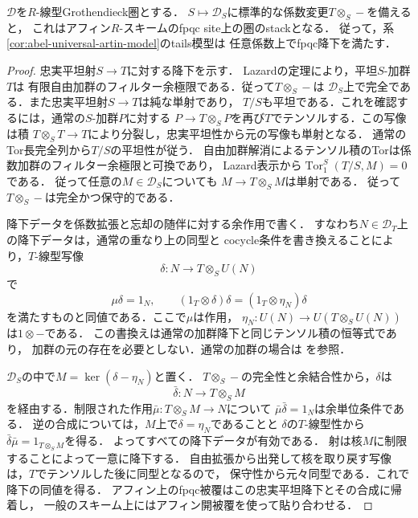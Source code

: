 \begin{proposition}[Grothendieck圏内の忠実平坦降下]
\label{prop:abel-coefficient-fpqc-descent}
$\mathcal D$を$R$-線型Grothendieck圏とする．
$S\mapsto\mathcal D_S$に標準的な係数変更$T\otimes_S-$を備えると，
これはアフィン$R$-スキームのfpqc site上の圏のstackとなる．
従って，系\ref{cor:abel-universal-artin-model}のtails模型は
任意係数上でfpqc降下を満たす．
\end{proposition}
\begin{proof}
忠実平坦射$S\to T$に対する降下を示す．
Lazardの定理\cite[Tag~058G]{StacksAbel}により，平坦$S$-加群$T$は
有限自由加群のフィルター余極限である．従って$T\otimes_S-$は
$\mathcal D_S$上で完全である．また忠実平坦射$S\to T$は純な単射であり，
$T/S$も平坦である．これを確認するには，通常の$S$-加群$P$に対する
$P\to T\otimes_S P$を再び$T$でテンソルする．この写像は積
$T\otimes_S T\to T$により分裂し，忠実平坦性から元の写像も単射となる．
通常のTor長完全列から$T/S$の平坦性が従う．
自由加群解消によるテンソル積のTorは係数加群のフィルター余極限と可換であり，
Lazard表示から$\operatorname{Tor}_1^S(T/S,M)=0$である．
従って任意の$M\in\mathcal D_S$についても
$M\to T\otimes_S M$は単射である．
従って$T\otimes_S-$は完全かつ保守的である．

降下データを係数拡張と忘却の随伴に対する余作用で書く．
すなわち$N\in\mathcal D_T$上の降下データは，通常の重なり上の同型と
cocycle条件を書き換えることにより，$T$-線型写像
\[
 \delta:N\longrightarrow T\otimes_S U(N)
\]
で
\[
 \mu\delta=1_N,
 \qquad
 (1_T\otimes\delta)\delta=(1_T\otimes\eta_N)\delta
\]
を満たすものと同値である．ここで$\mu$は作用，
$\eta_N:U(N)\to U(T\otimes_S U(N))$は$1\otimes-$である．
この書換えは通常の加群降下と同じテンソル積の恒等式であり，
加群の元の存在を必要としない．通常の加群の場合は
\cite[Tags~023N, 039Y]{StacksAbel}を参照．

$\mathcal D_S$の中で$M=\ker(\delta-\eta_N)$と置く．
$T\otimes_S-$の完全性と余結合性から，$\delta$は
\[
 \bar\delta:N\longrightarrow T\otimes_S M
\]
を経由する．制限された作用$\bar\mu:T\otimes_S M\to N$について
$\bar\mu\bar\delta=1_N$は余単位条件である．
逆の合成については，$M$上で$\delta=\eta_N$であることと
$\delta$の$T$-線型性から$\bar\delta\bar\mu=1_{T\otimes_S M}$を得る．
よってすべての降下データが有効である．
射は核$M$に制限することによって一意に降下する．
自由拡張から出発して核を取り戻す写像は，$T$でテンソルした後に同型となるので，
保守性から元々同型である．これで降下の同値を得る．
アフィン上のfpqc被覆はこの忠実平坦降下とその合成に帰着し，
一般のスキーム上にはアフィン開被覆を使って貼り合わせる．
\end{proof}

